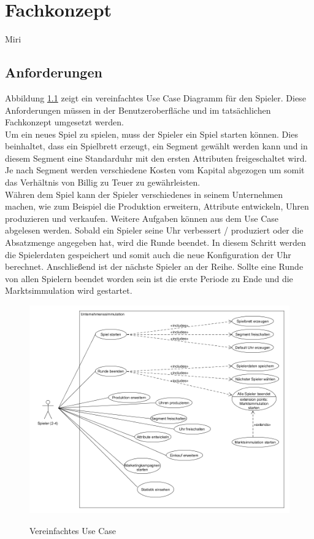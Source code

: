 \chapter{Fachkonzept}

Miri

\section{Anforderungen}

Abbildung \ref{fig:UseCase} zeigt ein vereinfachtes Use Case Diagramm für den Spieler. Diese Anforderungen müssen in der Benutzeroberfläche und im tatsächlichen Fachkonzept umgesetzt werden. \\
Um ein neues Spiel zu spielen, muss der Spieler ein Spiel starten können. Dies beinhaltet, dass ein Spielbrett erzeugt, ein Segment gewählt werden kann und in diesem Segment eine Standarduhr mit den ersten Attributen freigeschaltet wird. Je nach Segment werden verschiedene Kosten vom Kapital abgezogen um somit das Verhältnis von Billig zu Teuer zu gewährleisten. \\
Währen dem Spiel kann der Spieler verschiedenes in seinem Unternehmen machen, wie zum Beispiel die Produktion erweitern, Attribute entwickeln, Uhren produzieren und verkaufen. Weitere Aufgaben können aus dem Use Case abgelesen werden. Sobald ein Spieler seine Uhr verbessert / produziert oder die Absatzmenge angegeben hat, wird die Runde beendet. In diesem Schritt werden die Spielerdaten gespeichert und somit auch die neue Konfiguration der Uhr berechnet. Anschließend ist der nächste Spieler an der Reihe. Sollte eine Runde von allen Spielern beendet worden sein ist die erste Periode zu Ende und die Marktsimmulation wird gestartet.

\begin{figure}[!h]
	\centering
	\includegraphics[scale=0.4]{img/UseCase.png} 
	\label{fig:UseCase}
	\caption{Vereinfachtes Use Case}
\end{figure}

